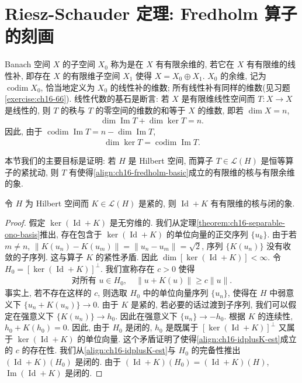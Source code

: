 \documentclass[../../main.tex]{subfiles}
\begin{document}
\section{Riesz-Schauder 定理: Fredholm 算子的刻画}\label{section:ch16-riesz-schauder}

Banach 空间 $X$ 的子空间 $X_{0}$ 称为是在 $X$ 有有限余维的, 若它在 $X$ 有有限维的线性补, 即存在 $X$ 的有限维子空间 $X_{1}$ 使得 $X=X_{0}\oplus X_{1}$. $X_{0}$ 的余维, 记为 $\operatorname{codim}X_{0}$, 恰当地定义为 $X_{0}$ 的线性补的维数; 所有线性补有同样的维数(见习题\cref{exercise:ch16-66}). 线性代数的基石是断言: 若 $X$ 是有限维线性空间而 $T:X\to X$ 是线性的, 则 $T$ 的秩与 $T$ 的零空间的维数的和等于 $X$ 的维数, 即若 $\dim X=n$,
\begin{align*}
\dim\operatorname{Im}T+\dim\ker T=n.
\end{align*}
因此, 由于 $\operatorname{codim}\operatorname{Im}T=n-\dim\operatorname{Im}T$,
\begin{align}
\dim\ker T=\operatorname{codim}\operatorname{Im}T.\label{align:ch16-fredholm-basic}
\end{align}

本节我们的主要目标是证明: 若 $H$ 是 Hilbert 空间, 而算子 $T\in\mathcal{L}(H)$ 是恒等算子的紧扰动, 则 $T$ 有使得\eqref{align:ch16-fredholm-basic}成立的有限维的核与有限余维的象.

\begin{proposition}\label{proposition:ch16-idplusK-kernel}
令 $H$ 为 Hilbert 空间而 $K\in\mathcal{L}(H)$ 是紧的, 则 $\operatorname{Id}+K$ 有有限维的核与闭的象.
\end{proposition}

\begin{proof}
假定 $\ker(\operatorname{Id}+K)$ 是无穷维的. 我们从定理\cref{theorem:ch16-separable-ono-basis}推出, 存在包含于 $\ker(\operatorname{Id}+K)$ 的单位向量的正交序列 $\{u_{k}\}$. 由于若 $m\neq n$, $\|K(u_{n})-K(u_{m})\|=\|u_{n}-u_{m}\|=\sqrt{2}$, 序列 $\{K(u_{n})\}$ 没有收敛的子序列. 这与算子 $K$ 的紧性矛盾. 因此 $\dim[\ker(\operatorname{Id}+K)]<\infty$. 令 $H_{0}=[\ker(\operatorname{Id}+K)]^{\perp}$. 我们宣称存在 $c>0$ 使得
\begin{align}
\text{对所有 }u\in H_{0},\quad\|u+K(u)\|\geqslant c\|u\|.\label{align:ch16-idplusK-est}
\end{align}
事实上, 若不存在这样的 $c$, 则选取 $H_{0}$ 中的单位向量序列 $\{u_{n}\}$, 使得在 $H$ 中弱意义下 $\{u_{n}+K(u_{n})\}\to 0$. 由于 $K$ 是紧的, 若必要的话过渡到子序列, 我们可以假定在强意义下 $\{K(u_{n})\}\to h_{0}$. 因此在强意义下 $\{u_{n}\}\to-h_{0}$. 根据 $K$ 的连续性, $h_{0}+K(h_{0})=0$. 因此, 由于 $H_{0}$ 是闭的, $h_{0}$ 是既属于 $[\ker(\operatorname{Id}+K)]^{\perp}$ 又属于 $\ker(\operatorname{Id}+K)$ 的单位向量. 这个矛盾证明了使得\eqref{align:ch16-idplusK-est}成立的 $c$ 的存在性. 我们从\eqref{align:ch16-idplusK-est}与 $H_{0}$ 的完备性推出 $(\operatorname{Id}+K)(H_{0})$ 是闭的. 由于 $(\operatorname{Id}+K)(H_{0})=(\operatorname{Id}+K)(H)$, $\operatorname{Im}(\operatorname{Id}+K)$ 是闭的.
\end{proof}
\end{document}
